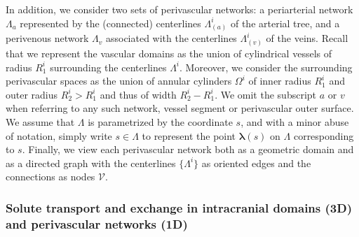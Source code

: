 In addition, we consider two sets of perivascular networks: a
periarterial network $\Lambda_a$ represented by the (connected)
centerlines $\Lambda^i_{(a)}$ of the arterial tree, and a perivenous
network $\Lambda_v$ associated with the centerlines $\Lambda^i_{(v)}$
of the veins. Recall that we represent the vascular domains as the
union of cylindrical vessels of radius $R_1^i$ surrounding the
centerlines $\Lambda^i$. Moreover, we consider the surrounding
perivascular spaces as the union of annular cylinders $\Omega^i$ of
inner radius $R_1^i$ and outer radius $R_2^i > R_1^i$ and thus of
width $R_2^i - R_1^i$.  We omit the subscript $a$ or $v$ when referring to any
such network, vessel segment or perivascular outer surface. We assume
that $\Lambda$ is parametrized by the coordinate $s$, and with a minor
abuse of notation, simply write $s \in \Lambda$ to represent the point
${\bm \lambda}(s)$ on $\Lambda$ corresponding to $s$. Finally, we view
each perivascular network both as a geometric domain and as a directed
graph with the centerlines $\{ \Lambda^i \}$ as oriented edges and the
connections as nodes $\mathcal{V}$.

\subsubsection{Solute transport and exchange in intracranial domains (3D) and perivascular networks (1D)}
\label{sec:app:transport_eqs}

